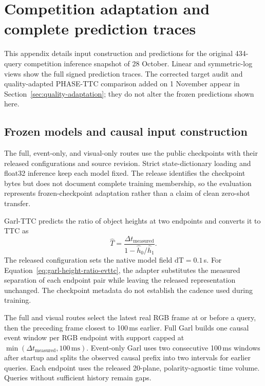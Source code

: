 \section{Competition adaptation and complete prediction traces}
\label{app:competition-details}
This appendix details input construction and predictions for the original 434-query competition inference snapshot of 28 October. Linear and symmetric-log views show the full signed prediction traces. The corrected target audit and quality-adapted PHASE-TTC comparison added on 1 November appear in Section~\ref{sec:quality-adaptation}; they do not alter the frozen predictions shown here. 

\subsection{Frozen models and causal input construction}

The full, event-only, and visual-only routes use the public checkpoints with their released configurations and source revision. Strict state-dictionary loading and float32 inference keep each model fixed. The release identifies the checkpoint bytes but does not document complete training membership, so the evaluation represents frozen-checkpoint adaptation rather than a claim of clean zero-shot transfer.

Garl-TTC predicts the ratio of object heights at two endpoints and converts it to TTC as
\begin{equation}
 \widehat T
 =\frac{\Delta t_{\mathrm{measured}}}
 {1-\widehat h_0/\widehat h_1}.
 \label{eq:garl-height-ratio-evttc}
\end{equation}
The released configuration sets the native model field $\mathrm{dT}=0.1$\,s. For Equation~\ref{eq:garl-height-ratio-evttc}, the adapter substitutes the measured separation of each endpoint pair while leaving the released representation unchanged. The checkpoint metadata do not establish the cadence used during training.

The full and visual routes select the latest real RGB frame at or before a query, then the preceding frame closest to 100\,ms earlier. Full Garl builds one causal event window per RGB endpoint with support capped at $\min(\Delta t_{\mathrm{measured}},100\,\mathrm{ms})$. Event-only Garl uses two consecutive 100\,ms windows after startup and splits the observed causal prefix into two intervals for earlier queries. Each endpoint uses the released 20-plane, polarity-agnostic time volume. Queries without sufficient history remain gaps.

